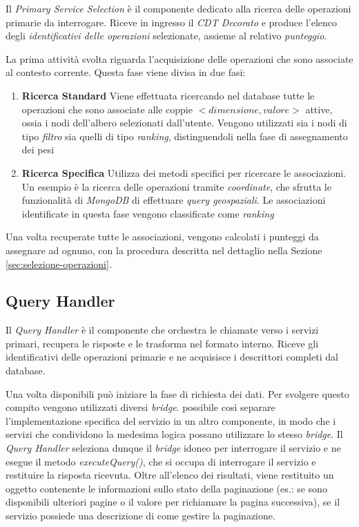 Il \emph{Primary Service Selection} è il componente dedicato alla ricerca delle operazioni primarie da interrogare. Riceve in ingresso il \emph{CDT Decorato} e produce l'elenco degli \emph{identificativi delle operazioni} selezionate, assieme al relativo \emph{punteggio}.

La prima attività svolta riguarda l'acquisizione delle operazioni che sono associate al contesto corrente. Questa fase viene divisa in due fasi:

\begin{enumerate}
	\item \textbf{Ricerca Standard}
	Viene effettuata ricercando nel database tutte le operazioni che sono associate alle coppie $ {<}dimensione, valore{>} $ attive, ossia i nodi dell'albero selezionati dall'utente. Vengono utilizzati sia i nodi di tipo \emph{filtro} sia quelli di tipo \emph{ranking}, distinguendoli nella fase di assegnamento dei pesi
	\item \textbf{Ricerca Specifica}
	Utilizza dei metodi specifici per ricercare le associazioni. Un esempio è la ricerca delle operazioni tramite \emph{coordinate}, che sfrutta le funzionalità di \emph{MongoDB} di effettuare \emph{query geospaziali}. Le associazioni identificate in questa fase vengono classificate come \emph{ranking}
\end{enumerate}

Una volta recuperate tutte le associazioni, vengono calcolati i punteggi da assegnare ad ognuno, con la procedura descritta nel dettaglio nella Sezione \ref{sec:selezione-operazioni}.

\subsection{Query Handler\label{sec:query-handler}}

Il \emph{Query Handler} è il componente che orchestra le chiamate verso i servizi primari, recupera le risposte e le trasforma nel formato interno. Riceve gli identificativi delle operazioni primarie e ne acquisisce i descrittori completi dal database.

Una volta disponibili può iniziare la fase di richiesta dei dati. Per svolgere questo compito vengono utilizzati diversi \emph{bridge}. \upe possibile così separare l'implementazione specifica del servizio in un altro componente, in modo che i servizi che condividono la medesima logica possano utilizzare lo stesso \emph{bridge}. Il \emph{Query Handler} seleziona dunque il \emph{bridge} idoneo per interrogare il servizio e ne esegue il metodo \emph{executeQuery()}, che si occupa di interrogare il servizio e restituire la risposta ricevuta. Oltre all'elenco dei risultati, viene restituito un oggetto contenente le informazioni sullo stato della paginazione (es.: se sono disponibili ulteriori pagine o il valore per richiamare la pagina successiva), se il servizio possiede una descrizione di come gestire la paginazione.


